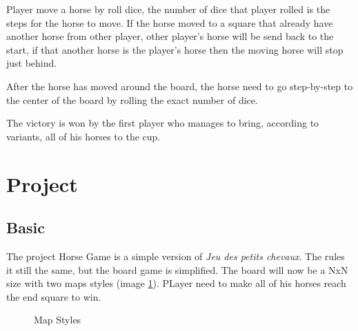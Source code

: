 \documentclass{article}
\begin{document}
\vspace{0.3cm}
\par
Player move a horse by roll dice, the number of dice that player rolled is the steps for the horse to move. If the horse moved to a square that already have another horse from other player, other player's horse will be send back to the start, if that another horse is the player's horse then the moving horse will stop just behind.

\vspace{0.3cm}
\par
After the horse has moved around the board, the horse need to go step-by-step to the center of the board by rolling the exact number of dice.

\vspace{0.3cm}
\par
The victory is won by the first player who manages to bring, according to variants, all of his horses to the cup.

\newpage

\section{Project}
\subsection{Basic}
The project Horse Game is a simple version of \emph{Jeu des petits chevaux}. The rules it still the same, but the board game is simplified. The board will now be a NxN size with two maps styles (image \ref{fig:map-style}). PLayer need to make all of his horses reach the end square to win.
\begin{figure}[h]
	\centering

	\caption{Map Styles}
	\label{fig:map-style}
\end{figure}
\end{document}

